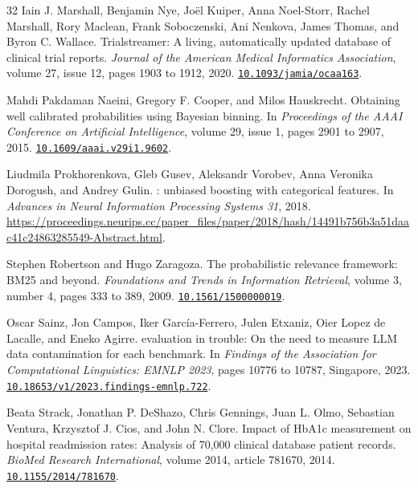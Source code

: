 \documentclass[11pt,letterpaper]{article}
\newcommand{\doi}[1]{\href{https://doi.org/#1}{\nolinkurl{#1}}}
\begin{document}
\begin{thebibliography}{32}
Iain J. Marshall, Benjamin Nye, Jo{\"e}l Kuiper, Anna Noel-Storr, Rachel Marshall, Rory Maclean, Frank Soboczenski, Ani Nenkova, James Thomas, and Byron C. Wallace.
\newblock Trialstreamer: A living, automatically updated database of clinical trial reports.
\newblock \emph{Journal of the American Medical Informatics Association}, volume 27, issue 12, pages 1903 to 1912, 2020.
\newblock \doi{10.1093/jamia/ocaa163}.

Mahdi Pakdaman Naeini, Gregory F. Cooper, and Milos Hauskrecht.
\newblock Obtaining well calibrated probabilities using {Bayesian} binning.
\newblock In \emph{Proceedings of the AAAI Conference on Artificial Intelligence}, volume 29, issue 1, pages 2901 to 2907, 2015.
\newblock \doi{10.1609/aaai.v29i1.9602}.

Liudmila Prokhorenkova, Gleb Gusev, Aleksandr Vorobev, Anna Veronika Dorogush, and Andrey Gulin.
: unbiased boosting with categorical features.
\newblock In \emph{Advances in Neural Information Processing Systems 31}, 2018.
\newblock \url{https://proceedings.neurips.cc/paper_files/paper/2018/hash/14491b756b3a51daac41c24863285549-Abstract.html}.

Stephen Robertson and Hugo Zaragoza.
\newblock The probabilistic relevance framework: {BM25} and beyond.
\newblock \emph{Foundations and Trends in Information Retrieval}, volume 3, number 4, pages 333 to 389, 2009.
\newblock \doi{10.1561/1500000019}.

Oscar Sainz, Jon Campos, Iker Garc{\'i}a-Ferrero, Julen Etxaniz, Oier Lopez de Lacalle, and Eneko Agirre.
 evaluation in trouble: On the need to measure {LLM} data contamination for each benchmark.
\newblock In \emph{Findings of the Association for Computational Linguistics: EMNLP 2023}, pages 10776 to 10787, Singapore, 2023.
\newblock \doi{10.18653/v1/2023.findings-emnlp.722}.

Beata Strack, Jonathan P. DeShazo, Chris Gennings, Juan L. Olmo, Sebastian Ventura, Krzysztof J. Cios, and John N. Clore.
\newblock Impact of {HbA1c} measurement on hospital readmission rates: Analysis of 70,000 clinical database patient records.
\newblock \emph{BioMed Research International}, volume 2014, article 781670, 2014.
\newblock \doi{10.1155/2014/781670}.


\end{thebibliography}
\end{document}
